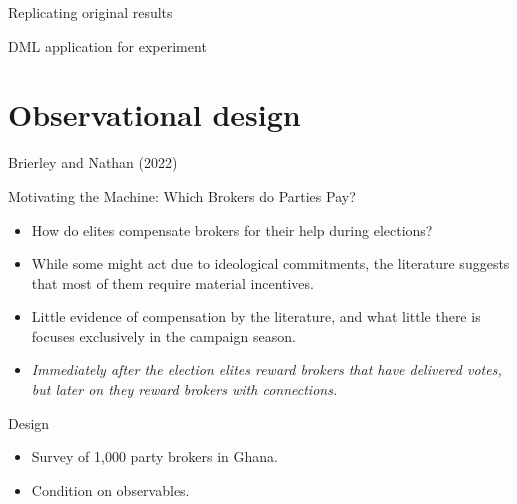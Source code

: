 \documentclass[10pt,table,aspectratio=169]{beamer}
\begin{document}
\begin{frame}[plain, label = two_dimensions]{Replicating original results}

\end{frame}


\begin{frame}[plain, label = two_dimensions]{DML application for experiment}

\end{frame}


\section{Observational design}

\begin{frame}[plain, label = two_dimensions]{Brierley and Nathan (2022)}

Motivating the Machine: Which Brokers do Parties Pay?

\begin{itemize}
  \item How do elites compensate brokers for their help during elections?
  \item While some might act due to ideological commitments, the literature suggests that most of them require material incentives.
  \item Little evidence of compensation by the literature, and what little there is focuses exclusively in the campaign season.
  \item \textit{Immediately after the election elites reward brokers that have delivered votes, but later on they reward brokers with connections.}
\end{itemize}

Design

\begin{itemize}
  \item Survey of 1,000 party brokers in Ghana.
  \item Condition on observables.
\end{itemize}

\end{frame}
\end{document}
